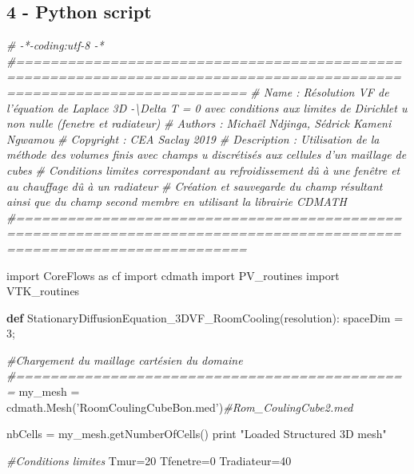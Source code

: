 \documentclass[11pt]{article}
\newenvironment{Shaded}{}{}
\newcommand{\KeywordTok}[1]{\textcolor[rgb]{0.00,0.44,0.13}{\textbf{{#1}}}}
\newcommand{\DecValTok}[1]{\textcolor[rgb]{0.25,0.63,0.44}{{#1}}}
\newcommand{\StringTok}[1]{\textcolor[rgb]{0.25,0.44,0.63}{{#1}}}
\newcommand{\CommentTok}[1]{\textcolor[rgb]{0.38,0.63,0.69}{\textit{{#1}}}}
\newcommand{\NormalTok}[1]{{#1}}
\newcommand{\ImportTok}[1]{{#1}}
\newcommand{\OperatorTok}[1]{\textcolor[rgb]{0.40,0.40,0.40}{{#1}}}
\newcommand{\BuiltInTok}[1]{{#1}}
\begin{document}
    \hypertarget{python-script}{%
\subsection{4 - Python script}\label{python-script}}

\begin{Shaded}
\begin{Highlighting}[]
\CommentTok{# -*-coding:utf-8 -*}
\CommentTok{#=======================================================================================================================}
\CommentTok{# Name        : Résolution VF de l'équation de Laplace 3D -\textbackslash{}Delta T = 0 avec conditions aux limites de Dirichlet u non nulle (fenetre et radiateur)}
\CommentTok{# Authors     : Michaël Ndjinga, Sédrick Kameni Ngwamou}
\CommentTok{# Copyright   : CEA Saclay 2019}
\CommentTok{# Description : Utilisation de la méthode des volumes finis avec champs u discrétisés aux cellules d'un maillage de cubes}
\CommentTok{#               Conditions limites correspondant au refroidissement dû à une fenêtre et au chauffage dû à un radiateur}
\CommentTok{#               Création et sauvegarde du champ résultant ainsi que du champ second membre en utilisant la librairie CDMATH}
\CommentTok{#=======================================================================================================================}

\ImportTok{import}\NormalTok{ CoreFlows }\ImportTok{as}\NormalTok{ cf}
\ImportTok{import}\NormalTok{ cdmath}
\ImportTok{import}\NormalTok{ PV_routines}
\ImportTok{import}\NormalTok{ VTK_routines}

\KeywordTok{def}\NormalTok{ StationaryDiffusionEquation_3DVF_RoomCooling(resolution):}
\NormalTok{    spaceDim }\OperatorTok{=} \DecValTok{3}\OperatorTok{;}
    
    \CommentTok{#Chargement du maillage cartésien du domaine}
    \CommentTok{#==============================================}
\NormalTok{    my_mesh }\OperatorTok{=}\NormalTok{ cdmath.Mesh(}\StringTok{'RoomCoulingCubeBon.med'}\NormalTok{)}\CommentTok{#Rom_CoulingCube2.med}
    
\NormalTok{    nbCells }\OperatorTok{=}\NormalTok{ my_mesh.getNumberOfCells()}
    \BuiltInTok{print} \StringTok{"Loaded Structured 3D mesh"}
    
    \CommentTok{#Conditions limites}
\NormalTok{    Tmur}\OperatorTok{=}\DecValTok{20}
\NormalTok{    Tfenetre}\OperatorTok{=}\DecValTok{0}
\NormalTok{    Tradiateur}\OperatorTok{=}\DecValTok{40}


\end{Highlighting}
\end{Shaded}
\end{document}
